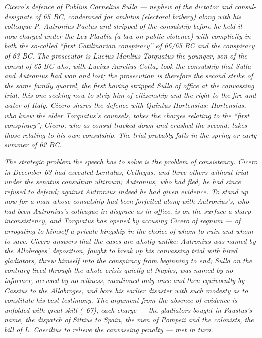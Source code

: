 
\textit{Cicero's defence of Publius Cornelius Sulla --- nephew of
the dictator and consul-designate of 65 BC, condemned for
\textit{ambitus} (electoral bribery) along with his colleague
P. Autronius Paetus and stripped of the consulship before he
held it --- now charged under the Lex Plautia (a law on public
violence) with complicity in both the so-called ``first
Catilinarian conspiracy'' of 66/65 BC and the conspiracy of
63 BC. The prosecutor is Lucius Manlius Torquatus the
younger, son of the consul of 65 BC who, with Lucius Aurelius
Cotta, took the consulship that Sulla and Autronius had won
and lost; the prosecution is therefore the second strike of
the same family quarrel, the first having stripped Sulla of
office at the canvassing trial, this one seeking now to
strip him of citizenship and the right to the fire and
water of Italy. Cicero shares the defence with Quintus
Hortensius: Hortensius, who knew the elder Torquatus's
counsels, takes the charges relating to the ``first
conspiracy''; Cicero, who as consul tracked down and crushed
the second, takes those relating to his own consulship. The
trial probably falls in the spring or early summer of 62 BC.}

\textit{The strategic problem the speech has to solve is the
problem of consistency. Cicero in December 63 had executed
Lentulus, Cethegus, and three others without trial under the
\textit{senatus consultum ultimum}; Autronius, who had fled,
he had since refused to defend; against Autronius indeed he
had given evidence. To stand up now for a man whose
consulship had been forfeited along with Autronius's, who
had been Autronius's colleague in disgrace as in office, is
on the surface a sharp inconsistency, and Torquatus has
opened by accusing Cicero of regnum --- of arrogating to
himself a private kingship in the choice of whom to ruin and
whom to save. Cicero answers that the cases are wholly
unlike: Autronius was named by the Allobroges' deposition,
fought to break up his canvassing trial with hired
gladiators, threw himself into the conspiracy from beginning
to end; Sulla on the contrary lived through the whole crisis
quietly at Naples, was named by no informer, accused by no
witness, mentioned only once and then equivocally by Cassius
to the Allobroges, and bore his earlier disaster with such
modesty as to constitute his best testimony. The argument
from the absence of evidence is unfolded with great skill
(--67), each charge --- the gladiators bought
in Faustus's name, the dispatch of Sittius to Spain, the
men of Pompeii and the colonists, the bill of L. Caecilius
to relieve the canvassing penalty --- met in turn.}

